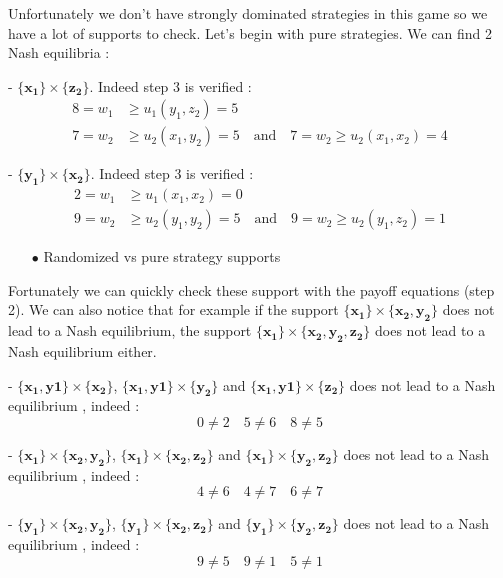 Unfortunately we don't have strongly dominated strategies in this game so we have a lot of supports to check. Let's begin with pure strategies. We can find 2 Nash equilibria :

- $\mathbf{\{x_1\}}\times\mathbf{\{z_2\}}$. Indeed step 3 is verified :
\begin{align*}
    8=w_1&\ge u_1(y_1,z_2)=5   \\
    7=w_2&\ge u_2(x_1,y_2)=5 \quad \mbox{and} \quad 7=w_2\ge u_2(x_1,x_2)=4 
\end{align*}


- $\mathbf{\{y_1\}}\times\mathbf{\{x_2\}}$. Indeed step 3 is verified :
\begin{align*}
    2=w_1&\ge u_1(x_1,x_2)=0 \\
    9=w_2&\ge u_2(y_1,y_2)=5  \quad \mbox{and} \quad  9=w_2\ge u_2(y_1,z_2)=1
\end{align*}

\begin{itemize}
  \item[$\bullet$] Randomized vs pure strategy supports
\end{itemize}

Fortunately we can quickly check these support with the payoff equations (step 2). We can also notice that for example if the support $\mathbf{\{x_1\}}\times\mathbf{\{x_2,y_2\}}$  does not lead to a Nash equilibrium, the support $\mathbf{\{x_1\}}\times\mathbf{\{x_2,y_2,z_2\}}$ does not lead to a Nash equilibrium either. 

- $\mathbf{\{x_1,y1\}}\times\mathbf{\{x_2\}}$, $\mathbf{\{x_1,y1\}}\times\mathbf{\{y_2\}}$ and $\mathbf{\{x_1,y1\}}\times\mathbf{\{z_2\}}$ does not lead to a Nash equilibrium , indeed :
\begin{equation*}
    0\ne2 \quad 5\ne6 \quad 8\ne5
\end{equation*}

- $\mathbf{\{x_1\}}\times\mathbf{\{x_2,y_2\}}$, $\mathbf{\{x_1\}}\times\mathbf{\{x_2,z_2\}}$ and $\mathbf{\{x_1\}}\times\mathbf{\{y_2,z_2\}}$ does not lead to a Nash equilibrium , indeed :
\begin{equation*}
    4\ne6 \quad 4\ne7 \quad 6\ne7
\end{equation*}

- $\mathbf{\{y_1\}}\times\mathbf{\{x_2,y_2\}}$, $\mathbf{\{y_1\}}\times\mathbf{\{x_2,z_2\}}$ and $\mathbf{\{y_1\}}\times\mathbf{\{y_2,z_2\}}$ does not lead to a Nash equilibrium , indeed :
\begin{equation*}
    9\ne5 \quad 9\ne1 \quad 5\ne1
\end{equation*}


